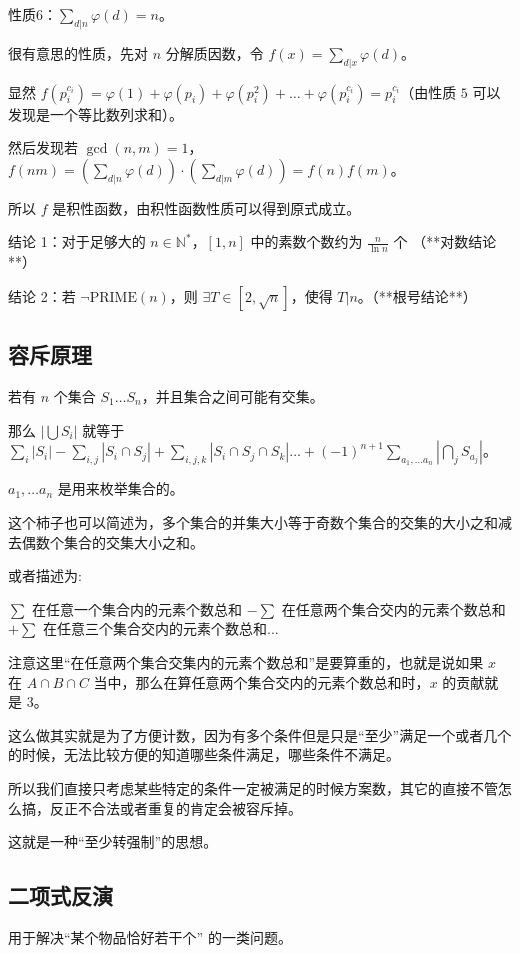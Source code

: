 \documentclass[titlepage, a4paper]{article}
\begin{document}
\begin{multicols}{2}
\begin{spacing}{0.6}
				 	性质6：$\sum_{d|n}\varphi(d)=n$。
				 	
				 	很有意思的性质，先对 $n$ 分解质因数，令 $f(x)=\sum_{d|x}\varphi(d)$。
				 	
				 	显然 $f(p_i^{c_i}) = \varphi(1)+\varphi(p_i)+\varphi(p_i^{2})+\dots+\varphi(p_i^{c_i}) = p_i^{c_i}$（由性质 $5$ 可以发现是一个等比数列求和）。
				 	
				 	然后发现若 $\gcd(n,m)=1$，$f(nm)=(\sum_{d|n}\varphi(d))\cdot(\sum_{d|m}\varphi(d))=f(n)f(m)$。
				 	
				 	所以 $f$ 是积性函数，由积性函数性质可以得到原式成立。
				 	
				 	结论 1：对于足够大的 $n \in \mathbb{N}^*$，$[1,n]$ 中的素数个数约为 $\frac{n}{\ln n}$ 个 （**对数结论**）
				 	
				 	结论 2：若 $\lnot \text{PRIME}(n)$，则 $\exists T \in [2,\sqrt{n}]$，使得 $T|n$。（**根号结论**）
			 	\subsection{容斥原理}
			 		若有 $n$ 个集合 $S_1 \dots S_n$，并且集合之间可能有交集。
			 	
				 	那么 $|\bigcup S_i|$ 就等于 $\sum_i |S_i| - \sum_{i, j} |S_i \cap S_j| + \sum_{i, j, k} |S_i \cap S_j \cap S_k| \dots + (-1)^{n + 1} \sum_{a_1, \dots a_n} |\bigcap_j S_{a_j}|$。
				 	
				 	$a_1, \dots a_n$ 是用来枚举集合的。
				 	
				 	这个柿子也可以简述为，多个集合的并集大小等于奇数个集合的交集的大小之和减去偶数个集合的交集大小之和。
				 	
				 	或者描述为:
				 	
				 	$\sum$ 在任意一个集合内的元素个数总和 $−\sum$ 在任意两个集合交内的元素个数总和 $+\sum$ 在任意三个集合交内的元素个数总和...
				 	
				 	注意这里“在任意两个集合交集内的元素个数总和”是要算重的，也就是说如果 $x$ 在 $A\cap B \cap C$ 当中，那么在算任意两个集合交内的元素个数总和时，$x$ 的贡献就是 $3$。
				 	
				 	这么做其实就是为了方便计数，因为有多个条件但是只是“至少”满足一个或者几个的时候，无法比较方便的知道哪些条件满足，哪些条件不满足。
				 	
				 	所以我们直接只考虑某些特定的条件一定被满足的时候方案数，其它的直接不管怎么搞，反正不合法或者重复的肯定会被容斥掉。
				 	
				 	这就是一种“至少转强制”的思想。
			 	\subsection{二项式反演}
			 	 	用于解决“某个物品恰好若干个” 的一类问题。
			 	 	

\end{spacing}
\end{multicols}
\end{document}
